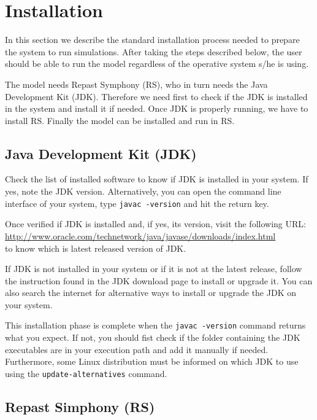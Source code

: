 \documentclass{article}
\begin{document}
\section{Installation}

In this section we describe the standard installation process needed to prepare the system to run simulations. After taking the steps described below, the user should be able to run the model regardless of the operative system s/he is using.

The model needs Repast Symphony (RS), who in turn needs the Java Development Kit (JDK). Therefore we need first to check if the JDK is installed in the system and install it if needed. Once JDK is properly running, we have to install RS. Finally the model can be installed and run in RS.

\subsection{Java Development Kit (JDK)}

Check the list of installed software to know if JDK is installed in your system. If yes, note the JDK version.
Alternatively, you can open the command line interface of your system, type \verb+javac -version+ and hit the return key. 

Once verified if JDK is installed and, if yes, its version, visit the following URL:\\
\url{http://www.oracle.com/technetwork/java/javase/downloads/index.html}\\
to know which is latest released version of JDK.

If JDK is not installed in your system or if it is not at the latest release, follow the instruction found in the JDK download page to install or upgrade it. You can also search the internet for alternative ways to install or upgrade the JDK on your system.

This installation phase is complete when the \verb+javac -version+ command returns what you expect.
If not, you should fist check if the folder containing the JDK executables are in your execution path and add it manually if needed.
Furthermore, some Linux distribution must be informed on which JDK to use using the \verb+update-alternatives+ command. 

\subsection{Repast Simphony (RS)}
\end{document}
